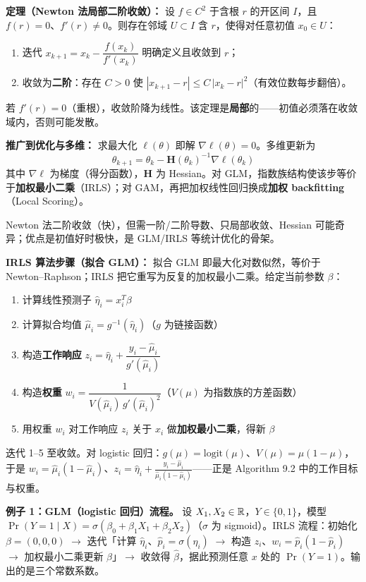 \textbf{定理（Newton 法局部二阶收敛）：} 设 $f \in C^2$ 于含根 $r$ 的开区间 $I$，且 $f(r) = 0$、$f'(r) \neq 0$。则存在邻域 $U \subset I$ 含 $r$，使得对任意初值 $x_0 \in U$：
\begin{enumerate}
    \item 迭代 $x_{k+1} = x_k - \dfrac{f(x_k)}{f'(x_k)}$ 明确定义且收敛到 $r$；
    \item 收敛为\textbf{二阶}：存在 $C > 0$ 使 $|x_{k+1} - r| \le C\,|x_k - r|^2$（有效位数每步翻倍）。
\end{enumerate}
若 $f'(r) = 0$（重根），收敛阶降为线性。该定理是\textbf{局部}的——初值必须落在收敛域内，否则可能发散。

\textbf{推广到优化与多维：} 求最大化 $\ell(\theta)$ 即解 $\nabla\ell(\theta) = 0$。多维更新为
\[
    \theta_{k+1} = \theta_k - \mathbf{H}(\theta_k)^{-1}\nabla\ell(\theta_k)
\]
其中 $\nabla\ell$ 为梯度（得分函数），$\mathbf{H}$ 为 Hessian。对 GLM，指数族结构使该步等价于\textbf{加权最小二乘}（IRLS）；对 GAM，再把加权线性回归换成\textbf{加权 backfitting}（Local Scoring）。

\begin{remark}
    Newton 法二阶收敛（快），但需一阶/二阶导数、只局部收敛、Hessian 可能奇异；优点是初值好时极快，是 GLM/IRLS 等统计优化的骨架。
\end{remark}

\textbf{IRLS 算法步骤（拟合 GLM）：} 拟合 GLM 即最大化对数似然，等价于 Newton--Raphson；IRLS 把它重写为反复的加权最小二乘。给定当前参数 $\beta$：
\begin{enumerate}
    \item 计算线性预测子 $\hat\eta_i = x_i^T\beta$
    \item 计算拟合均值 $\hat\mu_i = g^{-1}(\hat\eta_i)$（$g$ 为链接函数）
    \item 构造\textbf{工作响应} $z_i = \hat\eta_i + \dfrac{y_i - \hat\mu_i}{g'(\hat\mu_i)}$
    \item 构造\textbf{权重} $w_i = \dfrac{1}{V(\hat\mu_i)\,g'(\hat\mu_i)^2}$（$V(\mu)$ 为指数族的方差函数）
    \item 用权重 $w_i$ 对工作响应 $z_i$ 关于 $x_i$ 做\textbf{加权最小二乘}，得新 $\beta$
\end{enumerate}
迭代 1--5 至收敛。对 logistic 回归：$g(\mu) = \mathrm{logit}(\mu)$、$V(\mu) = \mu(1-\mu)$，于是 $w_i = \hat\mu_i(1-\hat\mu_i)$、$z_i = \hat\eta_i + \frac{y_i-\hat\mu_i}{\hat\mu_i(1-\hat\mu_i)}$——正是 Algorithm 9.2 中的工作目标与权重。

\textbf{例子 1：GLM（logistic 回归）流程。} 设 $X_1, X_2 \in \mathbb{R}$，$Y \in \{0,1\}$，模型 $\Pr(Y=1 \mid X) = \sigma(\beta_0 + \beta_1 X_1 + \beta_2 X_2)$（$\sigma$ 为 sigmoid）。IRLS 流程：初始化 $\beta = (0,0,0)$ $\rightarrow$ 迭代「计算 $\hat\eta_i$、$\hat p_i = \sigma(\hat\eta_i)$ $\rightarrow$ 构造 $z_i$、$w_i = \hat p_i(1-\hat p_i)$ $\rightarrow$ 加权最小二乘更新 $\beta$」$\rightarrow$ 收敛得 $\hat\beta$，据此预测任意 $x$ 处的 $\Pr(Y=1)$。输出的是三个常数系数。

